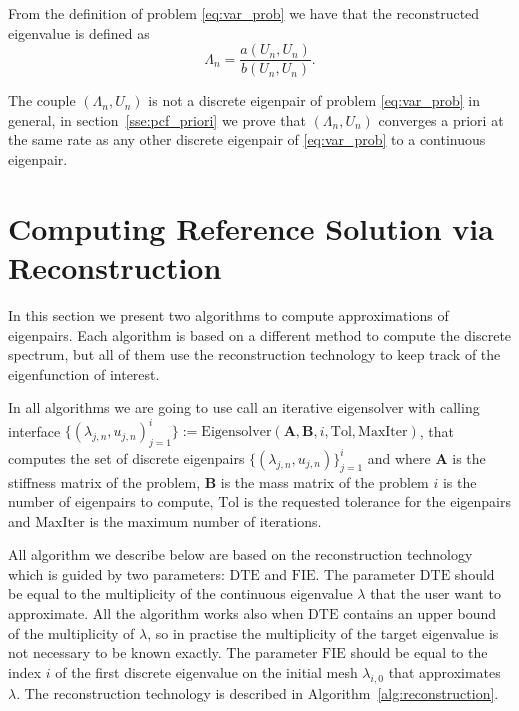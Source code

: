 \documentclass[preprint,12pt]{elsarticle}
\begin{document}
From the definition of problem \eqref{eq:var_prob} we have that the reconstructed eigenvalue is defined as
$$
\Lambda_n=\frac{a(U_n,U_n)}{b(U_n,U_n)}.
$$

The couple $(\Lambda_n,U_n)$ is not a discrete eigenpair of problem \eqref{eq:var_prob} in general, in section~\ref{sse:pcf_priori} we prove that $(\Lambda_n,U_n)$ converges a priori at the same rate as any other discrete eigenpair of \eqref{eq:var_prob} to a continuous eigenpair.

\section{Computing Reference Solution via Reconstruction}\label{sec:recoref}

In this section we present two algorithms to compute approximations of eigenpairs. Each algorithm is based on a different method to compute the discrete spectrum, but all of them use the reconstruction technology to keep track of the eigenfunction of interest.

In all algorithms we are going to use call an iterative eigensolver with calling interface
$\{(\lambda_{j,n},u_{j,n})_{j=1}^{i}\}:=\mathrm{Eigensolver}(\mathbf{A},\mathbf{B},i,\mathrm{Tol},\mathrm{MaxIter})$, that computes the set of discrete eigenpairs $\{(\lambda_{j,n},u_{j,n})\}_{j=1}^{i}$ and where $\mathbf{A}$ is the stiffness matrix of the problem, $\mathbf{B}$ is the mass matrix of the problem  $i$ is the number of eigenpairs to compute, $\mathrm{Tol}$ is the requested tolerance for the eigenpairs and $\mathrm{MaxIter}$ is the maximum number of iterations. 


All algorithm we describe below are based on the reconstruction technology which is guided by two parameters: $\mathrm{DTE}$ and $\mathrm{FIE}$. The parameter $\mathrm{DTE}$ should be equal to the multiplicity of the continuous eigenvalue $\lambda$ that the user want to approximate. All the algorithm works also when $\mathrm{DTE}$ contains an upper bound of the multiplicity of $\lambda$, so in practise the multiplicity of the target eigenvalue is not necessary to be known exactly. The parameter $\mathrm{FIE}$ should be equal to the index $i$ of the first discrete eigenvalue on the initial mesh $\lambda_{i,0}$ that approximates $\lambda$. The reconstruction technology is described in Algorithm~\eqref{alg:reconstruction}.
\end{document}
